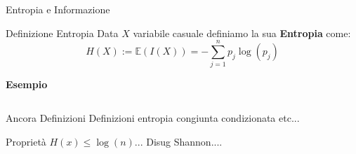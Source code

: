 \documentclass{beamer}
\theoremstyle{definition}
\numberwithin{equation}{section}
\begin{document}
\begin{frame}[t]{Entropia e Informazione} \vspace{5pt}

\begin{block}{Definizione Entropia}
\vspace{0.5em}
Data $X$ variabile casuale definiamo la sua \textbf{Entropia} come:
\begin{equation*}
H(X):=\mathbb{E}(I(X))=-\sum_{j=1}^np_j\log(p_j)
\end{equation*}
\vspace{0.5em}
\end{block}
\large \textbf{Esempio}

\begin{columns}[onlytextwidth]
\vspace{10pt}
\end{columns}
\vspace{0.5em}
\end{frame}


\begin{frame}[t]{Ancora Definizioni} \vspace{5pt}
Definizioni entropia congiunta condizionata etc...
\end{frame}


\begin{frame}[t]{Proprietà} \vspace{5pt}
$H(x) \leq \log(n)$...
Disug Shannon....
\end{frame}
\end{document}
